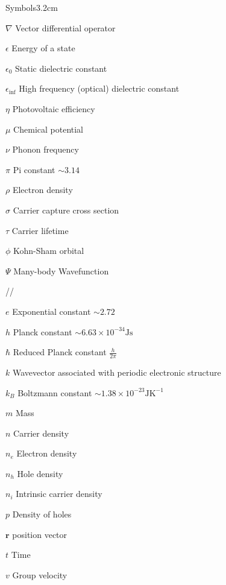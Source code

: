 \begin{mclistof}{Symbols}{3.2cm}

\item[$\nabla$] Vector differential operator
\item[$\epsilon$] Energy of a state
\item[$\epsilon_0$] Static dielectric constant
\item[$\epsilon_{\inf}$] High frequency (optical) dielectric constant 
\item[$\eta$] Photovoltaic efficiency
\item[$\mu$] Chemical potential
\item[$\nu$] Phonon frequency
\item[$\pi$] Pi constant $\sim 3.14$
\item[$\rho$] Electron density
\item[$\sigma$] Carrier capture cross section
\item[$\tau$] Carrier lifetime
\item[$\phi$] Kohn-Sham orbital

\item[$\Psi$] Many-body Wavefunction

//

\item[$e$] Exponential constant $\sim 2.72$
\item[$h$] Planck constant $\sim 6.63\times10^{-34}\textrm{Js}$
\item[$\hbar$] Reduced Planck constant $\frac{h}{2\pi}$ 
\item[$k$] Wavevector associated with periodic electronic structure
\item[$k_B$] Boltzmann constant $\sim 1.38\times10^{-23}\textrm{JK}^{-1}$
\item[$m$] Mass   %
\item[$n$] Carrier density
\item[$n_e$] Electron density
\item[$n_h$] Hole density
\item[$n_i$] Intrinsic carrier density
\item[$p$] Density of holes
\item[$\textbf{r}$] position vector
\item[$t$] Time
\item[$v$] Group velocity


\end{mclistof}
